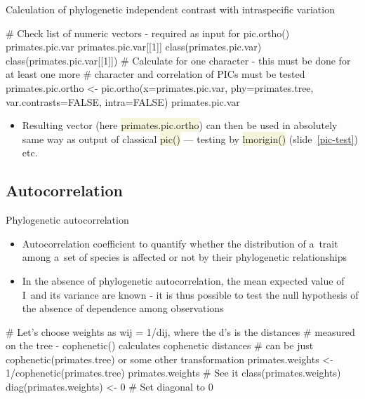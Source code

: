 \documentclass[compress, ucs, xelatex, 11pt, xcolor=svgnames, aspectratio=169,
	hyperref={
		bookmarks=true,
		unicode=true,
		colorlinks=true,
		pdftitle={Molecular data in R},
		plainpages=false,
		pdfauthor={Vojtech Zeisek},
		pdfsubject={Course about phylogeny and evolution in R},
		pdfcreator={XeLaTeX},
		pdfkeywords={R, evolution, phylogeny, molecular data},
		linkcolor=Crimson, %
		anchorcolor=Magenta, %
		citecolor=Magenta, %
		filecolor=Magenta, %
		menucolor=Magenta, %
		urlcolor=DodgerBlue, %
		pdftex},
	url={hyphens, lowtilde} %
	]{beamer}
\renewcommand{\texttt}[1]{\colorbox{Beige}{{\ttfamily #1}}}
\begin{document}
\begin{frame}[fragile]{Calculation of phylogenetic independent contrast with intraspecific variation}
	\begin{spluscode}
    # Check list of numeric vectors - required as input for pic.ortho()
    primates.pic.var
    primates.pic.var[[1]]
    class(primates.pic.var)
    class(primates.pic.var[[1]])
    # Calculate for one character - this must be done for at least one more
    # character and correlation of PICs must be tested
    primates.pic.ortho <- pic.ortho(x=primates.pic.var, phy=primates.tree,
      var.contrasts=FALSE, intra=FALSE)
    primates.pic.var
	\end{spluscode}
	\begin{itemize}
		\item Resulting vector (here \texttt{primates.pic.ortho}) can then be used in absolutely same way as output of classical \texttt{pic()} --- testing by \texttt{lmorigin()} (slide~\ref{pic-test}) etc.
	\end{itemize}
\end{frame}

\subsection{Autocorrelation}

\begin{frame}[fragile]{Phylogenetic autocorrelation}
	\begin{itemize}
		\item Autocorrelation coefficient to quantify whether the distribution of a~trait among a~set of species is affected or not by their phylogenetic relationships
		\item In the absence of phylogenetic autocorrelation, the mean expected value of I~and its variance are known - it is thus possible to test the null hypothesis of the absence of dependence among observations
	\end{itemize}
	\begin{spluscode}
    # Let's choose weights as wij = 1/dij, where the d’s is the distances
    # measured on the tree - cophenetic() calculates cophenetic distances
    # can be just cophenetic(primates.tree) or some other transformation
    primates.weights <- 1/cophenetic(primates.tree)
    primates.weights # See it
    class(primates.weights)
    diag(primates.weights) <- 0 # Set diagonal to 0
	\end{spluscode}
\end{frame}
\end{document}
